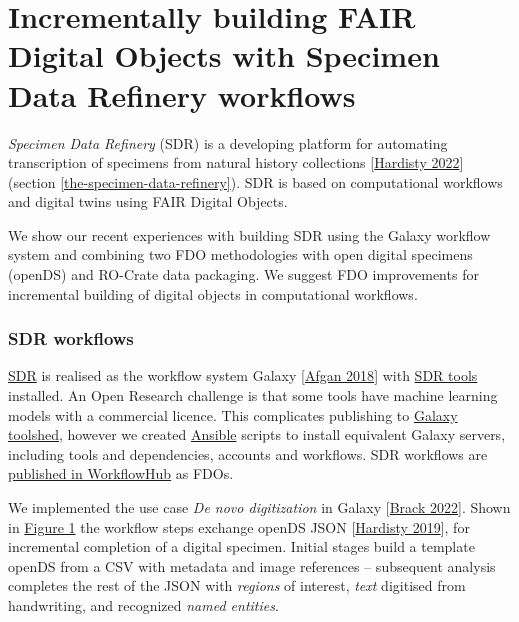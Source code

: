 \section{Incrementally building FAIR Digital Objects with Specimen Data
Refinery
workflows}
\label{incrementally-building-fair-digital-objects-with-specimen-data-refinery-workflows}

\emph{Specimen Data Refinery} (SDR) is a developing platform for
automating transcription of specimens from natural history collections
{[}\href{https://doi.org/10.1162/dint_a_00134}{Hardisty 2022}{]} (section \vref{the-specimen-data-refinery}). SDR is
based on computational workflows and digital twins using FAIR Digital
Objects.

We show our recent experiences with building SDR using the Galaxy
workflow system and combining two FDO methodologies with open digital
specimens (openDS) and RO-Crate data packaging. We suggest FDO
improvements for incremental building of digital objects in
computational workflows.

\hypertarget{sdr-workflows}{%
\subsubsection{SDR workflows}\label{sdr-workflows}}

\href{https://sdr.nhm.ac.uk/}{SDR} is realised as the workflow system
Galaxy {[}\href{https://doi.org/10.1093/nar/gky379}{Afgan 2018}{]} with
\href{https://github.com/DiSSCo/SDR}{SDR tools} installed. An Open
Research challenge is that some tools have machine learning models with
a commercial licence. This complicates publishing to
\href{https://toolshed.g2.bx.psu.edu/}{Galaxy toolshed}, however we
created \href{https://www.ansible.com/}{Ansible} scripts to install
equivalent Galaxy servers, including tools and dependencies, accounts
and workflows. SDR workflows are
\href{https://workflowhub.eu/projects/72}{published in WorkflowHub} as
FDOs.

We implemented the use case \emph{De novo digitization} in Galaxy
{[}\href{https://doi.org/10.48546/workflowhub.workflow.373.1}{Brack
2022}{]}. Shown in \protect\hyperlink{fig:workflow}{Figure 1} the
workflow steps exchange openDS JSON
{[}\href{https://doi.org/10.3897/biss.3.37033}{Hardisty 2019}{]}, for
incremental completion of a digital specimen. Initial stages build a
template openDS from a CSV with metadata and image references --
subsequent analysis completes the rest of the JSON with \emph{regions}
of interest, \emph{text} digitised from handwriting, and recognized
\emph{named entities}.

